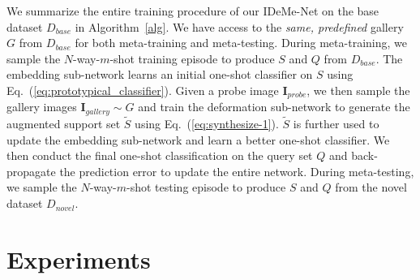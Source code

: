 \documentclass[10pt,letterpaper,twocolumn]{article}
\begin{document}
We summarize the entire training procedure of our IDeMe-Net
on the base dataset $D_{base}$ in Algorithm~\ref{alg}. We have access to the {\em same, predefined} gallery $G$ from $D_{base}$ for both meta-training and meta-testing. During meta-training,
we sample the $N$-way-$m$-shot training
episode to produce $S$ and $Q$ from $D_{base}$. The embedding sub-network learns
an initial one-shot classifier on $S$ using Eq.~(\ref{eq:prototypical_classifier}). Given
a probe image $\mathbf{I}_{probe}$, we then sample the gallery images
$\mathbf{I}_{gallery}\sim G$ and train the deformation sub-network
to generate the augmented support set $\tilde{S}$ using Eq.~(\ref{eq:synthesize-1}).
$\tilde{S}$ is further used to update the embedding sub-network and
learn a better one-shot classifier. We then conduct the final one-shot
classification on the query set $Q$ and back-propagate the prediction
error to update the entire network. During meta-testing, we sample
the $N$-way-$m$-shot testing episode to produce $S$ and $Q$ from
the novel dataset $D_{novel}$.

\section{Experiments}
\end{document}
